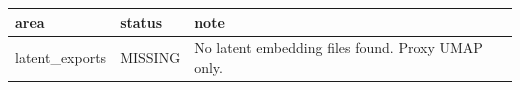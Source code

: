 \begin{tabular}{lll}
\toprule
area & status & note \\
\midrule
latent\_exports & MISSING & No latent embedding files found. Proxy UMAP only. \\
\bottomrule
\end{tabular}
